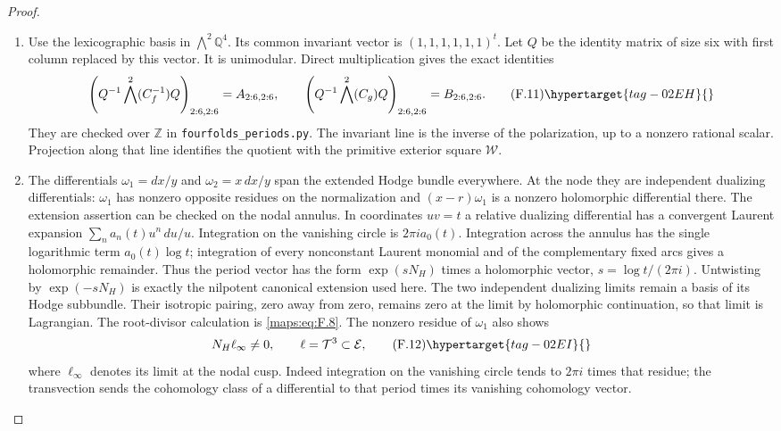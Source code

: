\begin{proof}
\begin{enumerate}[label={$\langle1\rangle$\arabic*.}]
\item Use the lexicographic basis in $\bigwedge^2\mathbb Q^4$.
Its common invariant vector is $(1,1,1,1,1,1)^t$.
Let $Q$ be the identity matrix of size six with first column
replaced by this vector.  It is unimodular.  Direct multiplication
gives the exact identities
\[
 \left(Q^{-1}\bigwedge^2(C_f^{-1})Q\right)_{2:6,2:6}
   =A_{2:6,2:6},\qquad
 \left(Q^{-1}\bigwedge^2(C_g)Q\right)_{2:6,2:6}
   =B_{2:6,2:6}.
 \tag{F.11}\hypertarget{tag-02EH}{}\label{maps:eq:F.11}
\]
They are checked over $\mathbb Z$ in
\texttt{fourfolds\_periods.py}.
The invariant line is the inverse of the polarization, up to a
nonzero rational scalar.  Projection along that line identifies
the quotient with the primitive exterior square $\mathcal W$.

\item The differentials $\omega_1=dx/y$ and $\omega_2=x\,dx/y$ span
the extended Hodge bundle everywhere.  At the node they are
independent dualizing differentials: $\omega_1$ has nonzero
opposite residues on the normalization and
$(x-r)\omega_1$ is a nonzero holomorphic differential there.
The extension assertion can be checked on the nodal annulus.
In coordinates $uv=t$ a relative dualizing differential has
a convergent Laurent expansion
$\sum_n a_n(t)u^n\,du/u$.  Integration on the vanishing circle
is $2\pi i a_0(t)$.  Integration across the annulus has the
single logarithmic term $a_0(t)\log t$; integration of every
nonconstant Laurent monomial and of the complementary fixed
arcs gives a holomorphic remainder.  Thus the period vector
has the form $\exp(sN_H)$ times a holomorphic vector,
$s=\log t/(2\pi i)$.  Untwisting by $\exp(-sN_H)$ is exactly
the nilpotent canonical extension used here.  The two independent
dualizing limits remain a basis of its Hodge subbundle.
Their isotropic pairing, zero away from zero, remains zero
at the limit by holomorphic continuation, so that limit is
Lagrangian.
The root-divisor calculation is \eqref{maps:eq:F.8}.
The nonzero residue of $\omega_1$ also shows
\[
 N_H\ell_\infty\ne0,
 \qquad \ell=\mathcal T^3\subset\mathcal E,
 \tag{F.12}\hypertarget{tag-02EI}{}\label{maps:eq:F.12}
\]
where $\ell_\infty$ denotes its limit at the nodal cusp.
Indeed integration on the vanishing circle tends to
$2\pi i$ times that residue; the transvection sends the cohomology
class of a differential to that period times its vanishing
cohomology vector.

\end{enumerate}
\end{proof}




